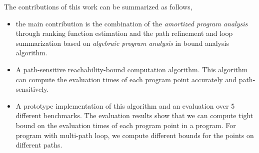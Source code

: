 The contributions of this work can be summarized as follows,
\begin{itemize}
  \item the main contribution is the combination of the \emph{amortized program analysis} through ranking function estimation and the path refinement and loop summarization based on \emph{algebraic program analysis} in bound analysis algorithm.
  \item A path-sensitive reachability-bound computation algorithm.
  This algorithm can compute the evaluation times of each program point accurately and path-sensitively.
  \item A prototype implementation of this algorithm and an evaluation over 5 different benchmarks.
  The evaluation results show that we can compute tight bound on the evaluation times of each program point in a program. For program with multi-path loop, we compute different bounds for the points on different paths.
\end{itemize}